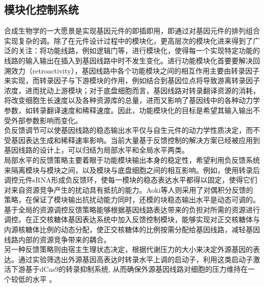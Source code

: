 \documentclass[b5paper,11pt,onecolumn,twoside,UTF8]{article}
\begin{document}
\subsection{模块化控制系统}
合成生物学的一大愿景是实现基因元件的即插即用\cite{endy2005foundations}，即通过对基因元件的排列组合实现复杂的调。除了在元件设计过程中的模块化，更高层次的模块化进来得到了广泛的关注：将功能线路，例如逻辑门等，进行模块化，使得每一个实现特定功能的线路的输入输出在插入到基因线路中时不发生变化\cite{10.1016/j.copbio.2019.11.015}。进行功能模块化首要要解决回溯效力（retroactivity）\cite{Qian2017}，基因线路中各个功能模块之间的相互作用主要由转录因子来实现，而转录因子与下游模块的作用，例如结合到基因位点将导致游离转录因子浓度，进而扰动上游模块；对于底盘细胞而言，基因线路对转录翻译资源的消耗，将改变细胞生长速度以及各种资源库的总量，进而又影响了基因线中的各种动力学参数，如转录翻译速度和稀释速度。因此，功能模块化的目标是希望其输入输出不受外部参数影响而变化。\\
\indent 负反馈调节可以使基因线路的稳态输出水平仅与自生元件的动力学性质决定，而不受基因表达生成和稀释速率影响。当前大量基于反馈控制的解决方案已经被应用到基因线路的设计上，可以归结为局部水平和全局水平两类。\\
\indent 局部水平的反馈策略主要着眼于功能模块输出本身的稳定性，希望利用负反馈系统来隔离模块与模块之间，以及模块与底盘细胞之间的相互影响。例如，使用转录后调控元件sRNA形成负反馈环，使每一模块的稳态表达水平都得以固定，使得它们对来自资源竞争产生的扰动具有抵抗的能力\cite{huang2018}。Aoki等人则采用了对偶积分反馈的策略，在保证了模块输出抗扰动能力同时，还模的块稳态输出水平是动态可调的\cite{Stephanie2019}。\\
\indent 基于全局的资源调控反馈策略能够根据基因线路表达带来的负担对所需的资源进行调控。在正交核糖体基因表达系统中加入反馈控制模块，能够实现对正交核糖体与内源核糖体比例的动态分配，使正交核糖体的比例按需分配给基因线路，减轻基因线路内部的资源竞争带来的耦合\cite{Darlington2018}。\\
\indent 另一种反馈策略则由宿主生理状态决定，根据代谢压力的大小来决定外源基因的表达。通过实验筛选出外源基因高表达时转录水平上调的启动子，利用这类启动子激活下游基于dCas9的转录抑制系统, 从而确保外源基因线路对细胞的压力维持在一个较低的水平 \cite{ceroni2018burden}。\\
\end{document}
